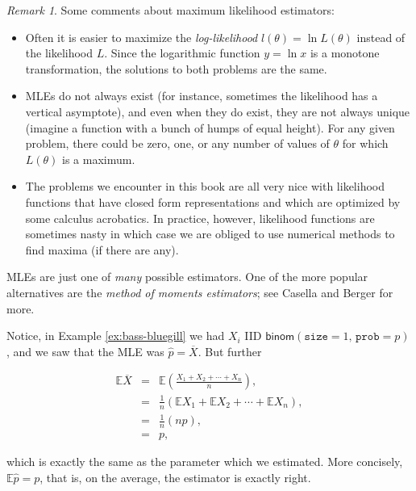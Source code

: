 \documentclass[]{book}
\providecommand{\tightlist}{%
  \setlength{\itemsep}{0pt}\setlength{\parskip}{0pt}}
\numberwithin{equation}{chapter}
\numberwithin{figure}{chapter}
\theoremstyle{plain}
\theoremstyle{definition}
\theoremstyle{remark}
\theoremstyle{definition}
\theoremstyle{definition}
\theoremstyle{remark}
\newtheorem*{remark}{Remark}
\begin{document}
\begin{remark}
Some comments about maximum likelihood estimators:

\begin{itemize}
\tightlist
\item
  Often it is easier to maximize the \emph{log-likelihood}
  \(l(\theta)=\ln  L(\theta)\) instead of the likelihood \(L\). Since
  the logarithmic function \(y=\ln x\) is a monotone transformation, the
  solutions to both problems are the same.
\item
  MLEs do not always exist (for instance, sometimes the likelihood has a
  vertical asymptote), and even when they do exist, they are not always
  unique (imagine a function with a bunch of humps of equal height). For
  any given problem, there could be zero, one, or any number of values
  of \(\theta\) for which \(L(\theta)\) is a maximum.
\item
  The problems we encounter in this book are all very nice with
  likelihood functions that have closed form representations and which
  are optimized by some calculus acrobatics. In practice, however,
  likelihood functions are sometimes nasty in which case we are obliged
  to use numerical methods to find maxima (if there are any).
\end{itemize}
\end{remark}

MLEs are just one of \emph{many} possible estimators. One of the more
popular alternatives are the \emph{method of moments estimators}; see
Casella and Berger \autocite{Casella2002} for more.

Notice, in Example \ref{ex:bass-bluegill} we had \(X_{i}\) IID
\(\mathsf{binom}(\mathtt{size}=1,\,\mathtt{prob}=p)\), and we saw that
the MLE was \(\hat{p}=\overline{X}\). But further

\begin{eqnarray*}
\mathbb{E}\overline{X} & = & \mathbb{E}\left(\frac{X_{1}+X_{2}+\cdots+X_{n}}{n}\right),\\
 & = & \frac{1}{n}\left(\mathbb{E} X_{1}+\mathbb{E} X_{2}+\cdots+\mathbb{E} X_{n}\right),\\
 & = & \frac{1}{n}\left(np\right),\\
 & = & p,
\end{eqnarray*}

which is exactly the same as the parameter which we estimated. More
concisely, \(\mathbb{E}\hat{p}=p\), that is, on the average, the
estimator is exactly right.

\bigskip
\end{document}

